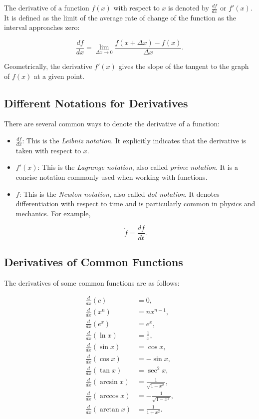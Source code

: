 \documentclass[../main.tex]{subfiles}
\begin{document}
The derivative of a function \(f(x)\) with respect to \(x\) is denoted by
\(\frac{df}{dx}\) or \(f'(x)\). It is defined as the limit of the average rate of change of the function as the interval approaches zero:

\[
\frac{df}{dx}
=
\lim_{\Delta x \to 0}
\frac{f(x+\Delta x)-f(x)}{\Delta x}.
\]

Geometrically, the derivative \(f'(x)\) gives the slope of the tangent to the graph of \(f(x)\) at a given point.

\subsection{Different Notations for Derivatives}

There are several common ways to denote the derivative of a function:

\begin{itemize}

\item $\frac{df}{dx}$: This is the \emph{Leibniz notation}. It explicitly indicates that the derivative is taken with respect to \(x\).

\item $f'(x)$: This is the \emph{Lagrange notation}, also called \emph{prime notation}. It is a concise notation commonly used when working with functions.

\item $\dot{f}$: This is the \emph{Newton notation}, also called \emph{dot notation}. It denotes differentiation with respect to time and is particularly common in physics and mechanics. For example,

$$
\dot{f} = \frac{df}{dt}.
$$

\end{itemize}

\subsection{Derivatives of Common Functions}

The derivatives of some common functions are as follows:

\begin{align*}
\frac{d}{dx}(c) &= 0, \\
\frac{d}{dx}(x^n) &= nx^{n-1}, \\
\frac{d}{dx}(e^x) &= e^x, \\
\frac{d}{dx}(\ln x) &= \frac{1}{x}, \\
\frac{d}{dx}(\sin x) &= \cos x, \\
\frac{d}{dx}(\cos x) &= -\sin x, \\
\frac{d}{dx}(\tan x) &= \sec^2 x, \\
\frac{d}{dx}(\arcsin x) &= \frac{1}{\sqrt{1-x^2}}, \\
\frac{d}{dx}(\arccos x) &= -\frac{1}{\sqrt{1-x^2}}, \\
\frac{d}{dx}(\arctan x) &= \frac{1}{1+x^2}.
\end{align*}
\end{document}
